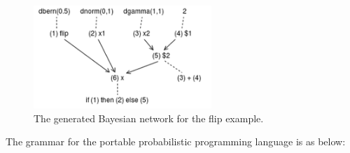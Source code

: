 \begin{figure}
    \centering
    \includegraphics[width=0.6\textwidth]{figures/flip_net.png}
    \caption{The generated Bayesian network for the flip example.}
    \label{fig:flip_net}
\end{figure}

The grammar for the portable probabilistic programming language is as below:
